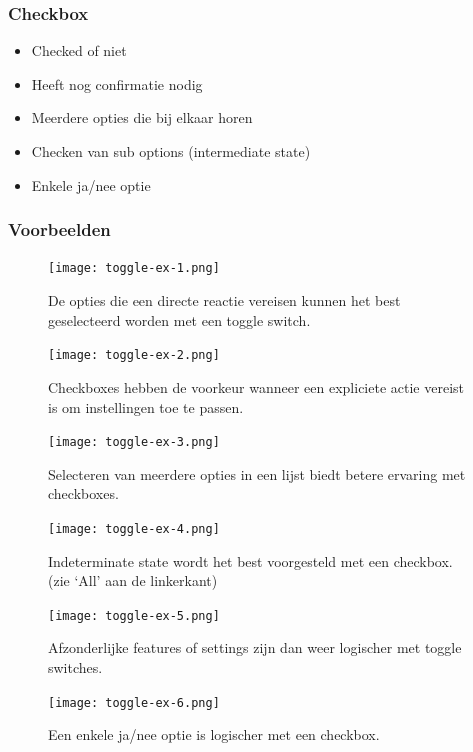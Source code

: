 \documentclass{article}
\begin{document}
\subsubsection{Checkbox}
\begin{itemize}
    \item Checked of niet
    \item Heeft nog confirmatie nodig
    \item Meerdere opties die bij elkaar horen
    \item Checken van sub options (intermediate state)
    \item Enkele ja/nee optie
\end{itemize}

\subsubsection{Voorbeelden}

\begin{figure}[H]
    \centering
    \texttt{[image: toggle-ex-1.png]}
    \caption{De opties die een directe reactie vereisen kunnen het best geselecteerd worden met een toggle switch.}
\end{figure}

\begin{figure}[H]
    \centering
    \texttt{[image: toggle-ex-2.png]}
    \caption{Checkboxes hebben de voorkeur wanneer een expliciete actie vereist is om instellingen toe te passen.}
\end{figure}

\begin{figure}[H]
    \centering
    \texttt{[image: toggle-ex-3.png]}
    \caption{Selecteren van meerdere opties in een lijst biedt betere ervaring met checkboxes.}
\end{figure}

\begin{figure}[H]
    \centering
    \texttt{[image: toggle-ex-4.png]}
    \caption{Indeterminate state wordt het best voorgesteld met een checkbox. (zie `All' aan de linkerkant)}
\end{figure}

\begin{figure}[H]
    \centering
    \texttt{[image: toggle-ex-5.png]}
    \caption{Afzonderlijke features of settings zijn dan weer logischer met toggle switches.}
\end{figure}

\begin{figure}[H]
    \centering
    \texttt{[image: toggle-ex-6.png]}
    \caption{Een enkele ja/nee optie is logischer met een checkbox.}
\end{figure}
\end{document}
